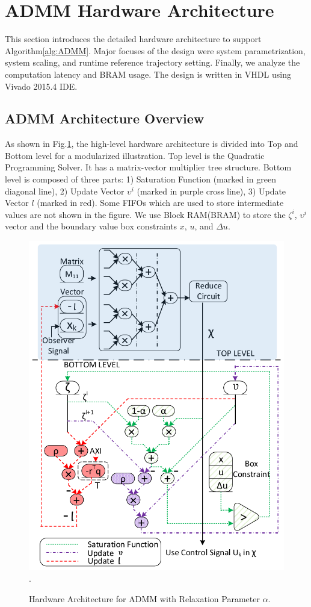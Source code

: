 \section{ADMM Hardware Architecture}\label{arch}
This section introduces the detailed hardware architecture to support Algorithm\cref{alg:ADMM}. Major focuses of the design were system parametrization, system scaling, and runtime reference trajectory setting. Finally, we analyze the computation latency and BRAM usage. The design is written in VHDL using Vivado 2015.4 IDE.
\subsection{ADMM Architecture Overview}
As shown in Fig.\cref{fig_arch}, the high-level hardware architecture is divided into Top and Bottom level for a modularized illustration. Top level is the Quadratic Programming Solver. It has a matrix-vector multiplier tree structure. Bottom level is composed of three parts: 1) Saturation Function (marked in green diagonal line), 2) Update Vector $\upsilon^i$ (marked in purple cross line), 3) Update Vector $l$ (marked in red). Some FIFOs which are used to store intermediate values are not shown in the figure. We use Block RAM(BRAM) to store the $\zeta^i$, $\upsilon^i$ vector and the boundary value box constraints $x$, $u$, and $\Delta u$.

\begin{figure}[t]
\centering
\captionsetup{justification=centering}
\includegraphics[scale=.59]{../figure/architecture.pdf}
\DeclareGraphicsExtensions.
\caption{Hardware Architecture for ADMM with Relaxation Parameter $\alpha$.\label{fig_arch}}
\end{figure}

